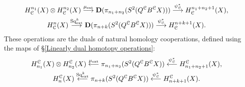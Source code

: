 \documentclass[11pt]{amsart}
\theoremstyle{plain}
\theoremstyle{definition}
\renewcommand{\to}{\longrightarrow}
\newcommand{\from}{\longleftarrow}
\newcommand{\calC}{\mathcal{C}}
\theoremstyle{plain}
\newcommand{\ExtCohOp}{\textup{Sq}_\textup{ext}}
\newcommand{\ExtCohProd}{\mu_\textup{ext}}
\newcommand{\dual}{\mathbf{D}}
\begin{document}
\begin{Constructing homotopy and cohomotopy operations}
\begin{gather*}
H_\calC^{n_1}(X)\otimes H_\calC^{n_2}(X)\overset{\ExtCohProd}{\to} \dual(\pi_{n_1+n_2}(S^2(Q^\calC B^\calC X)))\overset{\psi_\calC^*}{\to} H_\calC^{n_1+n_2+1}(X),\\
H_\calC^{n}(X)\overset{\ExtCohOp^k}{\to} \dual(\pi_{n+k}(S^2(Q^\calC B^\calC X)))\overset{\psi_\calC^*}{\to} H_\calC^{n+k+1}(X).
\end{gather*}
These operations are the duals of natural homology cooperations, defined using the maps of \S\ref{Linearly dual homotopy operations}:
\begin{gather*}
H^\calC_{n_1}(X)\otimes H^\calC_{n_2}(X)\overset{\ExtCohProd}{\from} \pi_{n_1+n_2}(S^2(Q^\calC B^\calC X))\overset{\psi_\calC^*}{\from} H^\calC_{n_1+n_2+1}(X),\\
H^\calC_{n}(X)\overset{\ExtCohOp^k}{\from} \pi_{n+k}(S^2(Q^\calC B^\calC X))\overset{\psi_\calC^*}{\from} H^\calC_{n+k+1}(X).
\end{gather*}


\end{Constructing homotopy and cohomotopy operations}
\end{document}
